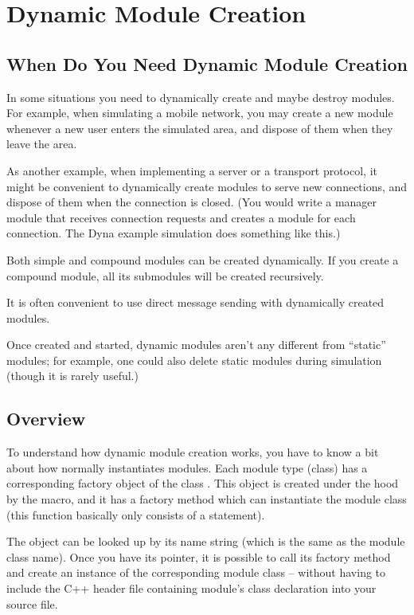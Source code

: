\section{Dynamic Module Creation}
\label{sec:simple-modules:dynamic-module-creation}

\subsection{When Do You Need Dynamic Module Creation}

In some situations you need to dynamically create and maybe destroy
modules. For example, when simulating a mobile network,
you may create a new module whenever a new user enters
the simulated area, and dispose of them when they leave the area.

As another example, when implementing a server or a transport
protocol, it might be convenient to dynamically create modules
to serve new connections, and dispose of them when the connection
is closed. (You would write a manager module that receives connection
requests and creates a module for each connection.
The Dyna example simulation does something like this.)

Both simple and compound modules can be created dynamically.
If you create a compound module, all its submodules will be created
recursively.

It is often convenient to use direct message sending with dynamically
created modules.

Once created and started, dynamic modules aren't any different from
``static'' modules; for example, one could also delete static modules
during simulation (though it is rarely useful.)


\subsection{Overview}


To understand how dynamic module creation works, you have to know a
bit about how {\opp} normally instantiates modules. Each module type
(class) has a corresponding factory object of the class
. This object is created under the hood by the
 macro, and it has a factory
method which can instantiate the module class (this function basically
only consists of a  statement).

The  object can be looked up by its name
string (which is the same as the module class name). Once you have its
pointer, it is possible to call its factory method and create an
instance of the corresponding module class -- without having to
include the C++ header file containing module's class declaration
into your source file.

